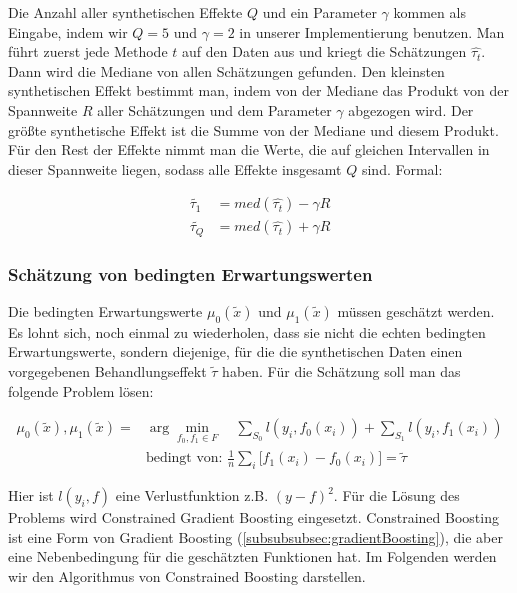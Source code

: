 \documentclass[12pt,a4paper,twoside]{scrartcl}
\numberwithin{equation}{section}
\begin{document}
\noindent
Die Anzahl aller synthetischen Effekte $Q$ und ein Parameter $\gamma$ kommen als Eingabe, indem wir $Q=5$ und $\gamma = 2$ in unserer Implementierung benutzen. Man führt zuerst jede Methode $t$ auf den Daten aus und kriegt die Schätzungen $\hat{\tau_t}$. Dann wird die Mediane von allen Schätzungen gefunden. Den kleinsten synthetischen Effekt bestimmt man, indem von der Mediane das Produkt von der Spannweite $R$ aller Schätzungen und dem Parameter $\gamma$ abgezogen wird. Der größte synthetische Effekt ist die Summe von der Mediane und diesem Produkt. Für den Rest der Effekte nimmt man die Werte, die auf gleichen Intervallen in dieser Spannweite liegen, sodass alle Effekte insgesamt $Q$ sind\cite{schuler2017synth}. Formal:\par

\begin{equation}\label{eq:3.5}
\begin{split}
 \tilde{\tau_1} &= med(\hat{\tau_t}) - \gamma R\\
 \tilde{\tau_Q} &= med(\hat{\tau_t}) + \gamma R
\end{split}
\end{equation}
	
\subsubsection{Schätzung von bedingten Erwartungswerten}\label{subsubsec:schätzungBedingtenErwartungswerten}
Die bedingten Erwartungswerte $\mu_0(\tilde{x})$ und $\mu_1(\tilde{x})$ müssen geschätzt werden. Es lohnt sich, noch einmal zu wiederholen, dass sie nicht die echten bedingten Erwartungswerte, sondern diejenige, für die die synthetischen Daten einen vorgegebenen Behandlungseffekt $\tilde{\tau}$ haben. Für die Schätzung soll man das folgende Problem lösen\cite{schuler2017synth}:\par

\begin{equation}\label{eq:3.6}
\begin{split}
 \mu_0(\tilde{x}),\mu_1(\tilde{x}) = &\arg\min_{f_0,f_1 \in F} \quad \sum_{S_0} l(y_i,f_0(x_i)) + \sum_{S_1} l(y_i,f_1(x_i))\\
 &\text{bedingt von: } \frac{1}{n} \sum_i \big [f_1(x_i) - f_0(x_i) \big ] = \tilde{\tau}
\end{split}
\end{equation}

\noindent
Hier ist $l(y_i,f)$  eine Verlustfunktion z.B. $(y-f)^2$. Für die Lösung des Problems wird Constrained Gradient Boosting eingesetzt. Constrained Boosting ist eine Form von Gradient Boosting (\ref{subsubsubsec:gradientBoosting}), die aber eine Nebenbedingung für die geschätzten Funktionen hat. Im Folgenden werden wir den Algorithmus von Constrained Boosting darstellen\cite{schuler2017synth}.\par
 
\end{document}
